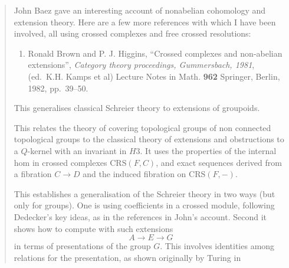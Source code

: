 \documentclass{article}
\def\tightlist{}
\renewcommand{\texttt}[1]{%
  \begingroup
  \ttfamily
  \begingroup\lccode`~=`/\lowercase{\endgroup\def~}{/\discretionary{}{}{}}%
  \begingroup\lccode`~=`[\lowercase{\endgroup\def~}{[\discretionary{}{}{}}%
  \begingroup\lccode`~=`.\lowercase{\endgroup\def~}{.\discretionary{}{}{}}%
  \catcode`/=\active\catcode`[=\active\catcode`.=\active
  \scantokens{#1\noexpand}%
  \endgroup
}
\begin{document}
\begin{quote}
John Baez gave an interesting account of nonabelian cohomology and
extension theory. Here are a few more references with which I have been
involved, all using crossed complexes and free crossed resolutions:

\begin{enumerate}
\def\labelenumi{\arabic{enumi})}
\setcounter{enumi}{19}
\tightlist
\item
  Ronald Brown and P. J. Higgins, ``Crossed complexes and non-abelian
  extensions'', \emph{Category theory proceedings, Gummersbach, 1981},
  (ed.~K.H. Kamps et al) Lecture Notes in Math. \textbf{962} Springer,
  Berlin, 1982, pp.~39--50.
\end{enumerate}

This generalises classical Schreier theory to extensions of groupoids.


This relates the theory of covering topological groups of non connected
topological groups to the classical theory of extensions and
obstructions to a \(Q\)-kernel with an invariant in \(H3\). It uses the
properties of the internal hom in crossed complexes
\(\mathrm{CRS}(F,C)\), and exact sequences derived from a fibration
\(C \to D\) and the induced fibration on \(\mathrm{CRS}(F,-)\).


This establishes a generalisation of the Schreier theory in two ways
(but only for groups). One is using coefficients in a crossed module,
following Dedecker's key ideas, as in the references in John's account.
Second it shows how to compute with such extensions \[A \to E \to G\] in
terms of presentations of the group \(G\). This involves identities
among relations for the presentation, as shown originally by Turing in


\end{quote}
\end{document}
